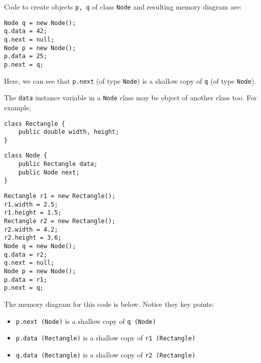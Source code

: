 Code to create objects \texttt{p, q} of class \texttt{Node} and resulting memory diagram are:

\begin{lstlisting}
Node q = new Node();
q.data = 42;
q.next = null;
Node p = new Node();
p.data = 25;
p.next = q;
\end{lstlisting}

\begin{center}
\end{center}

Here, we can see that \texttt{p.next} (of type \texttt{Node}) is a shallow copy of \texttt{q} (of type \texttt{Node}).

The \texttt{data} instance variable in a \texttt{Node} class may be object of another class too. For example,

\begin{lstlisting}
class Rectangle {
	public double width, height;
}  
\end{lstlisting}

\begin{lstlisting}
class Node {
	public Rectangle data;
	public Node next;
}
\end{lstlisting}

\begin{lstlisting}
Rectangle r1 = new Rectangle();
r1.width = 2.5;
r1.height = 1.5;
Rectangle r2 = new Rectangle();
r2.width = 4.2;
r2.height = 3.6;
Node q = new Node();
q.data = r2;
q.next = null;
Node p = new Node();
p.data = r1;
p.next = q;
\end{lstlisting}

The memory diagram for this code is below. Notice they key points:

\begin{itemize}
\item \texttt{p.next (Node)} is a shallow copy of \texttt{q (Node)}
\item \texttt{p.data (Rectangle)} is a shallow copy of \texttt{r1 (Rectangle)}
\item \texttt{q.data (Rectangle)} is a shallow copy of \texttt{r2 (Rectangle)}
\end{itemize}

